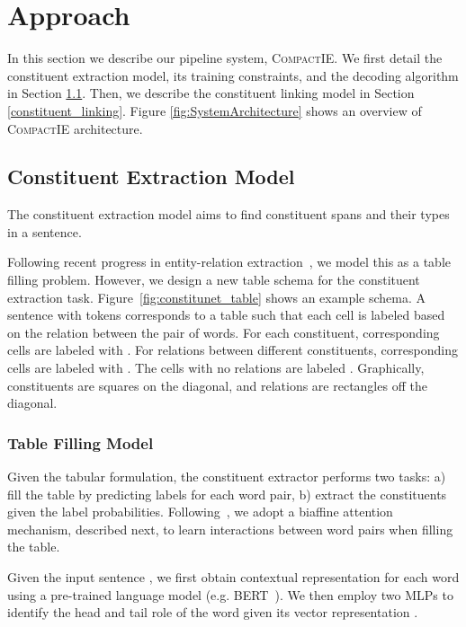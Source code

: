 \documentclass[11pt,a4paper]{article}
\newcommand{\system}{{\textsc{CompactIE}}}
\begin{document}
\section{Approach}
{In this section we describe our pipeline system, \system{}. We first detail the constituent extraction model, its training constraints, and the decoding algorithm in Section \ref{constituent_extraction}. Then, we describe the constituent linking model in Section \ref{constituent_linking}. Figure \ref{fig:SystemArchitecture} shows an overview of \system{} architecture.}


\subsection{Constituent Extraction Model}
\label{constituent_extraction}

The constituent extraction model aims to find constituent spans and their types in a sentence. 
{Following recent progress in entity-relation extraction~\cite{wang2021unire}, we model this as a table filling problem. However, we design a new table schema for the constituent extraction task. 
Figure~\ref{fig:constitunet_table} shows an example schema. A sentence  with  tokens corresponds to a table  such that each cell is labeled based on the relation between the pair of words. For each constituent, corresponding cells are labeled {with }. For relations between different constituents, corresponding cells are labeled {with }. The cells with no relations are labeled . Graphically, constituents are squares on the diagonal, and relations are rectangles off the diagonal. 

\subsubsection{Table Filling Model}
\label{'sec3.1.1'}

Given the tabular formulation, the constituent extractor performs two tasks: a) fill the table by predicting labels for each word pair, b) extract the constituents given the label probabilities. Following~\citep{wang2021unire}, we adopt a biaffine attention mechanism, described next, to learn interactions between word pairs when filling the table.}

\noindent
Given the input sentence , we first obtain contextual representation  for each word using a pre-trained language model (e.g. BERT~\cite{DBLP:journals/corr/abs-1810-04805}). We then employ two MLPs to identify the head and tail role of the word given its vector representation .
\end{document}
